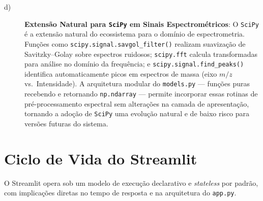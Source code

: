 \begin{description}
\item[d)] \textbf{Extensão Natural para \texttt{SciPy} em Sinais Espectrométricos}: O
\texttt{SciPy} é a extensão natural do ecossistema para o domínio de espectrometria.
Funções como \texttt{scipy.signal.savgol\_filter()} realizam suavização de Savitzky--Golay
sobre espectros ruidosos; \texttt{scipy.fft} calcula transformadas para análise no domínio
da frequência; e \texttt{scipy.signal.find\_peaks()} identifica automaticamente picos em
espectros de massa (eixo $m/z$ vs.\ Intensidade). A arquitetura modular do
\texttt{models.py} — funções puras recebendo e retornando \texttt{np.ndarray} — permite
incorporar essas rotinas de pré-processamento espectral sem alterações na camada de
apresentação, tornando a adoção de \texttt{SciPy} uma evolução natural e de baixo risco
para versões futuras do sistema.

\end{description}

\section{Ciclo de Vida do Streamlit}

O Streamlit opera sob um modelo de execução declarativo e \textit{stateless} por padrão,
com implicações diretas no tempo de resposta e na arquitetura do \texttt{app.py}.

